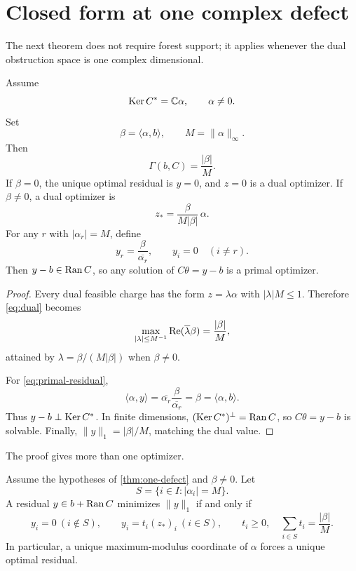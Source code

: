 \section{Closed form at one complex defect}
\label{sec:one-defect}

The next theorem does not require forest support; it applies whenever
the dual obstruction space is one complex dimensional.

\begin{theorem}\label{thm:one-defect}
Assume
\[
 \operatorname{Ker} C^*=\mathbb C\alpha,
 \qquad \alpha\ne0.
\]
Set
\[
 \beta=\langle\alpha,b\rangle,
 \qquad
 M=\|\alpha\|_\infty.
\]
Then
\begin{equation}\label{eq:one-defect-value}
 \boxed{\displaystyle
\Gamma(b,C)=\frac{|\beta|}{M}.}
\end{equation}
If \(\beta=0\), the unique optimal residual is \(y=0\), and \(z=0\)
is a dual optimizer.
If \(\beta\ne0\), a dual optimizer is
\begin{equation}\label{eq:dual-opt}
 z_*=\frac{\beta}{M|\beta|}\,\alpha.
\end{equation}
For any \(r\) with \(|\alpha_r|=M\), define
\begin{equation}\label{eq:primal-residual}
 y_r=\frac{\beta}{\overline{\alpha_r}},
 \qquad
 y_i=0\quad(i\ne r).
\end{equation}
Then \(y-b\in\operatorname{Ran} C\), so any solution of \(C\theta=y-b\) is a primal
optimizer.
\end{theorem}

\begin{proof}
Every dual feasible charge has the form \(z=\lambda\alpha\) with
\(|\lambda|M\le1\).  Therefore \eqref{eq:dual} becomes
\[
 \max_{|\lambda|\le M^{-1}}
 \operatorname{Re}(\overline{\lambda}\beta)
 =\frac{|\beta|}{M},
\]
attained by \(\lambda=\beta/(M|\beta|)\) when \(\beta\ne0\).

For \eqref{eq:primal-residual},
\[
 \langle\alpha,y\rangle
 =\overline{\alpha_r}
   \frac{\beta}{\overline{\alpha_r}}
 =\beta
 =\langle\alpha,b\rangle.
\]
Thus \(y-b\perp\operatorname{Ker} C^*\).  In finite dimensions,
\((\operatorname{Ker} C^*)^\perp=\operatorname{Ran} C\), so \(C\theta=y-b\) is solvable.  Finally,
\(\|y\|_1=|\beta|/M\), matching the dual value.
\end{proof}

The proof gives more than one optimizer.

\begin{theorem}\label{thm:residual-face}
Assume the hypotheses of \cref{thm:one-defect} and \(\beta\ne0\).
Let
\[
 S=\{i\in I:|\alpha_i|=M\}.
\]
A residual \(y\in b+\operatorname{Ran} C\) minimizes \(\|y\|_1\) if and only if
\begin{equation}\label{eq:residual-face}
 y_i=0\ (i\notin S),
 \qquad
 y_i=t_i(z_*)_i\ (i\in S),
 \qquad
 t_i\ge0,\quad
 \sum_{i\in S}t_i=\frac{|\beta|}{M}.
\end{equation}
In particular, a unique maximum-modulus coordinate of \(\alpha\)
forces a unique optimal residual.
\end{theorem}

